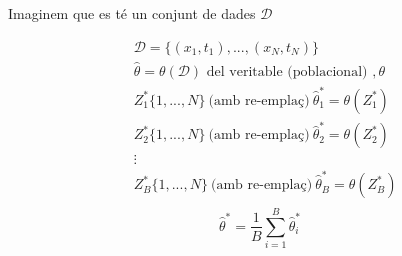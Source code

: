 Imaginem que es té un conjunt de dades $\mathcal{D}$

\begin{align*}
	&\mathcal{D} = \{ (x_1, t_1),..., (x_N, t_N) \} \\
	& \hat{\theta} = \theta(\mathcal{D}) \text{ del veritable (poblacional) }, \theta \\
	& Z_1^* \{ 1, ..., N \} \ \text{(amb re-emplaç)}\ \hat{\theta}_1^* = \theta(Z_1^*) \\
	& Z_2^* \{ 1, ..., N \} \ \text{(amb re-emplaç)}\ \hat{\theta}_2^* = \theta(Z_2^*) \\
	& \vdots \\
	& Z_B^* \{ 1, ..., N \} \ \text{(amb re-emplaç)}\ \hat{\theta}_B^* = \theta(Z_B^*) \\
\end{align*}
$$
\hat{\theta}^* = \frac{1}{B} \sum_{i=1}^B \hat{\theta}_i^*
$$
